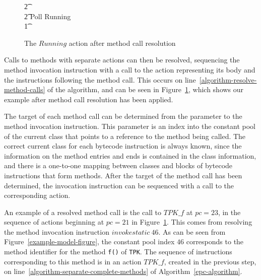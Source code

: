 \begin{figure}[tp!]
{\begin{circus}
    \t2 {} \cdots {} \\
    \t2 \circfi \circseq Poll \circseq Running \\
    \t1 \circfi
  \end{circus}
  }
  \caption{The $Running$ action after method call resolution}
  \label{method-call-resolution-example-figure}
\end{figure}

Calls to methods with separate actions can then be resolved,
sequencing the method invocation instruction with a call to the
\Circus{} action representing its body and the instructions following
the method call. 
This occurs on line~\ref{algorithm-resolve-method-calls} of the
algorithm, and can be seen in
Figure~\ref{method-call-resolution-example-figure}, which shows our
example after method call resolution has been applied.

The target of each method call can be determined from the parameter to
the method invocation instruction.
This parameter is an index into the constant pool of the current class
that points to a reference to the method being called.
The correct current class for each bytecode instruction is always
known, since the information on the method entries and ends is
contained in the class information, and there is a one-to-one mapping
between classes and blocks of bytecode instructions that form methods.
After the target of the method call has been determined, the
invocation instruction can be sequenced with a call to the
corresponding \Circus{} action.

An example of a resolved method call is the call to $TPK\_f$ at
$pc = 23$, in the sequence of actions beginning at $pc = 21$ in
Figure~\ref{method-call-resolution-example-figure}. 
This comes from resolving the method invocation instruction
$invokestatic~46$.
As can be seen from Figure~\ref{example-model-figure}, the constant
pool index $46$ corresponds to the method identifier for the method
\texttt{f()} of \texttt{TPK}.
The sequence of instructions corresponding to this method is in an
action $TPK\_f$, created in the previous step, on
line~\ref{algorithm-separate-complete-methods} of
Algorithm~\ref{epc-algorithm}.

